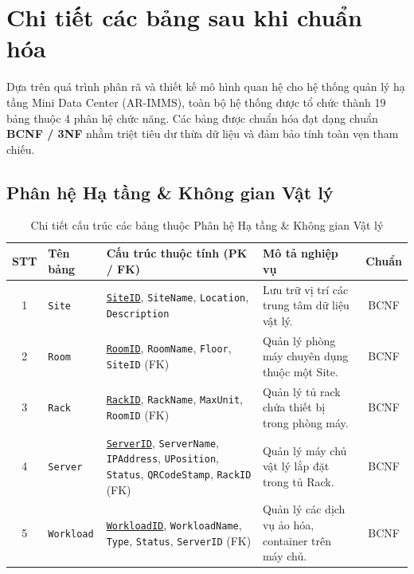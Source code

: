 \section{Chi tiết các bảng sau khi chuẩn hóa}

Dựa trên quá trình phân rã và thiết kế mô hình quan hệ cho hệ thống quản lý hạ tầng Mini Data Center (AR-IMMS), toàn bộ hệ thống được tổ chức thành 19 bảng thuộc 4 phân hệ chức năng. Các bảng được chuẩn hóa đạt dạng chuẩn \textbf{BCNF / 3NF} nhằm triệt tiêu dư thừa dữ liệu và đảm bảo tính toàn vẹn tham chiếu.

\subsection{Phân hệ Hạ tầng \& Không gian Vật lý}

\begin{table}[H]
\centering
\caption{Chi tiết cấu trúc các bảng thuộc Phân hệ Hạ tầng \& Không gian Vật lý}
\label{tab:ph_hatang}
\small
\begin{tabularx}{\textwidth}{|c|l|X|X|c|}
\hline
\textbf{STT} & \textbf{Tên bảng} & \textbf{Cấu trúc thuộc tính (PK / FK)} & \textbf{Mô tả nghiệp vụ} & \textbf{Chuẩn} \\ \hline
1 & \texttt{Site} & \underline{\texttt{SiteID}}, \texttt{SiteName}, \texttt{Location}, \texttt{Description} & Lưu trữ vị trí các trung tâm dữ liệu vật lý. & BCNF \\ \hline
2 & \texttt{Room} & \underline{\texttt{RoomID}}, \texttt{RoomName}, \texttt{Floor}, \texttt{SiteID} (FK) & Quản lý phòng máy chuyên dụng thuộc một Site. & BCNF \\ \hline
3 & \texttt{Rack} & \underline{\texttt{RackID}}, \texttt{RackName}, \texttt{MaxUnit}, \texttt{RoomID} (FK) & Quản lý tủ rack chứa thiết bị trong phòng máy. & BCNF \\ \hline
4 & \texttt{Server} & \underline{\texttt{ServerID}}, \texttt{ServerName}, \texttt{IPAddress}, \texttt{UPosition}, \texttt{Status}, \texttt{QRCodeStamp}, \texttt{RackID} (FK) & Quản lý máy chủ vật lý lắp đặt trong tủ Rack. & BCNF \\ \hline
5 & \texttt{Workload} & \underline{\texttt{WorkloadID}}, \texttt{WorkloadName}, \texttt{Type}, \texttt{Status}, \texttt{ServerID} (FK) & Quản lý các dịch vụ ảo hóa, container trên máy chủ. & BCNF \\ \hline
\end{tabularx}
\end{table}

